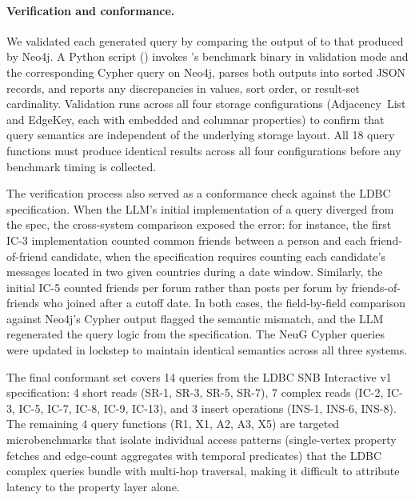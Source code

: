 \paragraph{Verification and conformance.}
We validated each generated query by comparing the output of \project{} to that produced by Neo4j.
A Python script () invokes \project{}'s benchmark binary in validation mode and the corresponding Cypher query on Neo4j, parses both outputs into sorted JSON records, and reports any discrepancies in values, sort order, or result-set cardinality.
Validation runs across all four \project{} storage configurations (Adjacency~List and EdgeKey, each with embedded and columnar properties) to confirm that query semantics are independent of the underlying storage layout.
All 18 query functions must produce identical results across all four configurations before any benchmark timing is collected.

The verification process also served as a conformance check against the LDBC specification.
When the LLM's initial implementation of a query diverged from the spec, the cross-system comparison exposed the error: for instance, the first IC-3 implementation counted common friends between a person and each friend-of-friend candidate, when the specification requires counting each candidate's messages located in two given countries during a date window.
Similarly, the initial IC-5 counted friends per forum rather than posts per forum by friends-of-friends who joined after a cutoff date.
In both cases, the field-by-field comparison against Neo4j's Cypher output flagged the semantic mismatch, and the LLM regenerated the query logic from the specification.
The NeuG Cypher queries were updated in lockstep to maintain identical semantics across all three systems.

The final conformant set covers 14 queries from the LDBC SNB Interactive v1 specification: 4 short reads (SR-1, SR-3, SR-5, SR-7), 7 complex reads (IC-2, IC-3, IC-5, IC-7, IC-8, IC-9, IC-13), and 3 insert operations (INS-1, INS-6, INS-8).
The remaining 4 query functions (R1, X1, A2, A3, X5) are targeted microbenchmarks that isolate individual access patterns (single-vertex property fetches and edge-count aggregates with temporal predicates) that the LDBC complex queries bundle with multi-hop traversal, making it difficult to attribute latency to the property layer alone.

